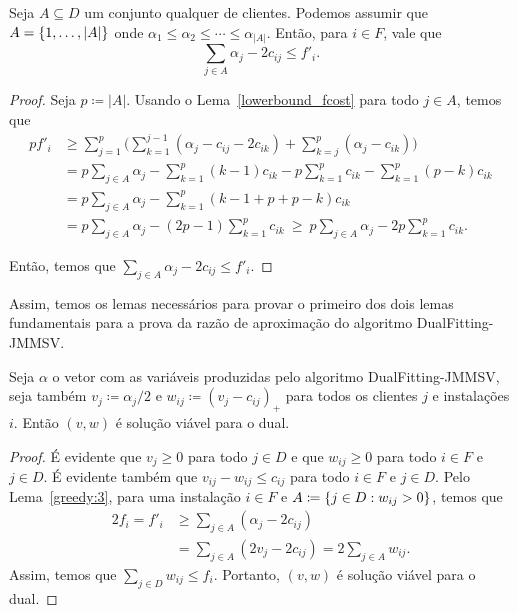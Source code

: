 \begin{lemma}
\label{greedy:3}
Seja $A \subseteq D$ um conjunto qualquer de clientes. Podemos assumir que $A = \{1,\ldots,|A|\}$ onde $\alpha_1 \leq \alpha_2 \leq \cdots \leq \alpha_{|A|}$. Então, para $i \in F$, vale que
\[ \sum_{j \in A}\alpha_j - 2c_{ij} \leq f'_i.
\]
\end{lemma}
\begin{proof}
Seja $p \coloneqq |A|$. Usando o Lema~\ref{lowerbound_fcost} para todo $j \in A$, temos que
\begin{subequations}
\begin{align*}
  p f'_i &\geq \sum_{j=1}^p {\big (} \sum_{k=1}^{j-1} (\alpha_j - c_{ij} - 2c_{ik}) + \sum_{k=j}^p (\alpha_j - c_{ik}) {\big )} \\
  &= p\sum_{j \in A}\alpha_j - \sum_{k=1}^p (k-1)c_{ik} - p\sum_{k=1}^p c_{ik} - \sum_{k=1}^p (p-k) c_{ik} \\
  &= p\sum_{j \in A}\alpha_j - \sum_{k=1}^p (k-1+p+p-k)c_{ik} \\
  &= p\sum_{j \in A}\alpha_j - (2p -1 )\sum_{k=1}^p c_{ik} \ \geq \ p\sum_{j \in A}\alpha_j - 2p\sum_{k=1}^p c_{ik}.
\end{align*}
\end{subequations}

Então, temos que $\sum_{j \in A}\alpha_j - 2c_{ij} \leq f'_i$.

\end{proof}

Assim, temos os lemas necessários para provar o primeiro dos dois lemas fundamentais para a prova da razão de aproximação do algoritmo {\sc DualFitting-JMMSV}.

\begin{lemma}
\label{greedy:4}
Seja $\alpha$ o vetor com as variáveis produzidas pelo algoritmo {\sc DualFitting-JMMSV}, seja também $v_j \coloneqq \alpha_j/2$ e $w_{ij} \coloneqq (v_j - c_{ij})_+$ para todos os clientes $j$ e instalações $i$. Então $(v,w)$ é solução viável para o dual. 
\end{lemma}

\begin{proof}
É evidente que $v_j \geq 0$ para todo $j \in D$ e que $w_{ij} \geq 0$ para todo $i \in F$ e $j \in D$. É evidente também que $v_{ij} - w_{ij} \leq c_{ij}$ para todo $i \in F$ e $j \in D$. Pelo Lema~\ref{greedy:3}, para uma instalação $i\in F$ e $A \coloneqq \{j \in D: w_{ij} > 0\}$, temos que
\begin{subequations}
\begin{align*}
2 f_i = f'_i &\geq \sum_{j \in A} (\alpha_j - 2c_{ij}) \\
 &= \sum_{j \in A}(2v_j - 2c_{ij}) = 2 \sum_{j \in A} w_{ij}.
\end{align*}
\end{subequations}
Assim, temos que $\sum_{j \in D} w_{ij} \leq f_i$. Portanto, $(v,w)$ é solução viável para o dual.
\end{proof}


